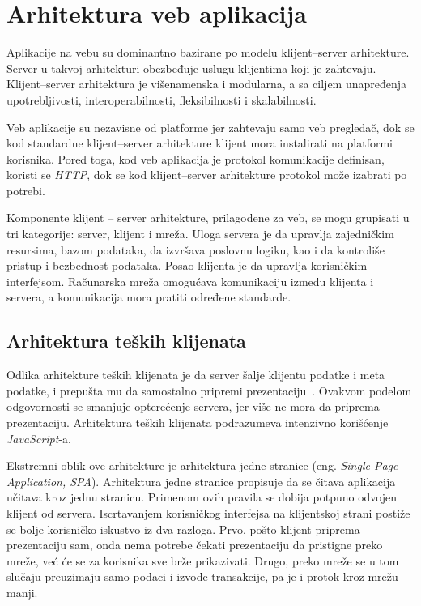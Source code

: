 \section{Arhitektura veb aplikacija}\label{ch:arhitektura}

Aplikacije na vebu su dominantno bazirane po modelu klijent--server arhitekture. 
Server u takvoj arhitekturi obezbeđuje uslugu klijentima koji je zahtevaju. Klijent--server 
arhitektura je višenamenska i modularna, a sa ciljem unapređenja upotrebljivosti, interoperabilnosti, 
fleksibilnosti i skalabilnosti. 

Veb aplikacije su nezavisne od platforme jer zahtevaju samo veb pregledač, dok se kod standardne 
klijent--server arhitekture klijent mora instalirati na platformi korisnika. Pored toga, 
kod veb aplikacija je protokol komunikacije definisan, koristi se \textit{HTTP}, dok se kod klijent--server
arhitekture protokol može izabrati po potrebi.

Komponente klijent -- server arhitekture, prilagođene za veb, se mogu grupisati u tri kategorije: 
server, klijent i mreža. Uloga servera je da upravlja zajedničkim resursima, bazom podataka, da 
izvršava poslovnu logiku, kao i da kontroliše pristup i bezbednost podataka. Posao klijenta je da 
upravlja korisničkim interfejsom. Računarska mreža omogućava komunikaciju između klijenta i servera, 
a komunikacija mora pratiti određene standarde.

\subsection{Arhitektura teških klijenata}\label{sec:arhitektura-spa}

Odlika arhitekture teških klijenata je da server šalje klijentu podatke i meta podatke, i prepušta 
mu da samostalno pripremi prezentaciju~\cite{PVEB}. Ovakvom podelom odgovornosti se smanjuje opterećenje 
servera, jer više ne mora da priprema prezentaciju. Arhitektura teških klijenata podrazumeva intenzivno 
korišćenje \textit{JavaScript}-a.

Ekstremni oblik ove arhitekture je arhitektura jedne stranice (eng. \textit{Single Page Application, SPA}).
Arhitektura jedne stranice propisuje da se čitava aplikacija učitava kroz jednu stranicu. Primenom 
ovih pravila se dobija potpuno odvojen klijent od servera. Iscrtavanjem korisničkog 
interfejsa na klijentskoj strani postiže se bolje korisničko iskustvo iz dva razloga. Prvo, pošto klijent 
priprema prezentaciju sam, onda nema potrebe čekati prezentaciju da pristigne preko mreže, već će se za korisnika
sve brže prikazivati. Drugo, preko mreže se u tom slučaju preuzimaju samo podaci i izvode transakcije, 
pa je i protok kroz mrežu manji.

